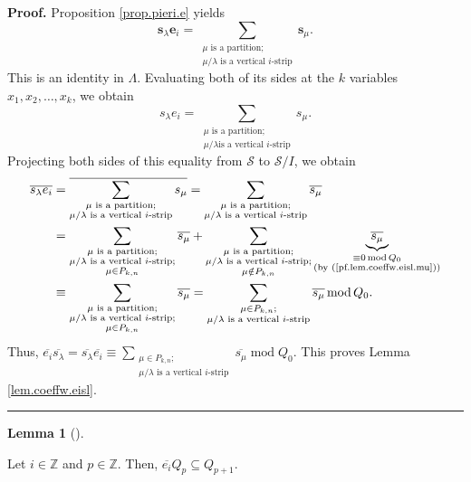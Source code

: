 \documentclass[numbers=enddot,12pt,final,onecolumn,notitlepage]{scrartcl}%
\theoremstyle{definition}
\newtheorem{lem}[theo]{Lemma}
\newenvironment{lemma}[1][]
{\begin{lem}[#1]\begin{leftbar}}
{\end{leftbar}\end{lem}}
\newenvironment{proof}[1][Proof]{\noindent\textbf{#1.} }{\ \rule{0.5em}{0.5em}}
\let\sumnonlimits\sum
\renewcommand{\sum}{\sumnonlimits\limits}
\begin{document}
\begin{proof}
Proposition \ref{prop.pieri.e} yields%
\[
\mathbf{s}_{\lambda}\mathbf{e}_{i}=\sum_{\substack{\mu\text{ is a
partition;}\\\mu/\lambda\text{ is a vertical }i\text{-strip}}}\mathbf{s}_{\mu
}.
\]
This is an identity in $\Lambda$. Evaluating both of its sides at the $k$
variables $x_{1},x_{2},\ldots,x_{k}$, we obtain%
\[
s_{\lambda}e_{i}=\sum_{\substack{\mu\text{ is a partition;}\\\mu/\lambda\text{
is a vertical }i\text{-strip}}}s_{\mu}.
\]
Projecting both sides of this equality from $\mathcal{S}$ to $\mathcal{S}/I$,
we obtain%
\begin{align*}
\overline{s_{\lambda}}\overline{e_{i}}  &  =\overline{\sum_{\substack{\mu
\text{ is a partition;}\\\mu/\lambda\text{ is a vertical }i\text{-strip}%
}}s_{\mu}}=\sum_{\substack{\mu\text{ is a partition;}\\\mu/\lambda\text{ is a
vertical }i\text{-strip}}}\overline{s_{\mu}}\\
&  =\sum_{\substack{\mu\text{ is a partition;}\\\mu/\lambda\text{ is a
vertical }i\text{-strip;}\\\mu\in P_{k,n}}}\overline{s_{\mu}}+\sum
_{\substack{\mu\text{ is a partition;}\\\mu/\lambda\text{ is a vertical
}i\text{-strip;}\\\mu\notin P_{k,n}}}\underbrace{\overline{s_{\mu}}%
}_{\substack{\equiv0\operatorname{mod}Q_{0}\\\text{(by
(\ref{pf.lem.coeffw.eisl.mu}))}}}\\
&  \equiv\sum_{\substack{\mu\text{ is a partition;}\\\mu/\lambda\text{ is a
vertical }i\text{-strip;}\\\mu\in P_{k,n}}}\overline{s_{\mu}}=\sum
_{\substack{\mu\in P_{k,n};\\\mu/\lambda\text{ is a vertical }i\text{-strip}%
}}\overline{s_{\mu}}\operatorname{mod}Q_{0}.
\end{align*}
Thus, $\overline{e_{i}}\overline{s_{\lambda}}=\overline{s_{\lambda}}%
\overline{e_{i}}\equiv\sum_{\substack{\mu\in P_{k,n};\\\mu/\lambda\text{ is a
vertical }i\text{-strip}}}\overline{s_{\mu}}\operatorname{mod}Q_{0}$. This
proves Lemma \ref{lem.coeffw.eisl}.
\end{proof}

\begin{lemma}
\label{lem.coeffw.eiQ}Let $i\in\mathbb{Z}$ and $p\in\mathbb{Z}$. Then,
$\overline{e_{i}}Q_{p}\subseteq Q_{p+1}$.
\end{lemma}
\end{document}
